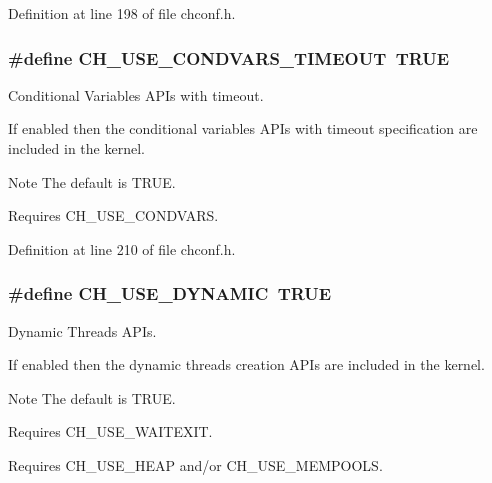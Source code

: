 Definition at line 198 of file chconf.\+h.

\hypertarget{group__config_gaccc2c032c409bced696f75877e270979}{}
\subsubsection[{C\+H\+\_\+\+U\+S\+E\+\_\+\+C\+O\+N\+D\+V\+A\+R\+S\+\_\+\+T\+I\+M\+E\+O\+U\+T}]{\setlength{\rightskip}{0pt plus 5cm}\#define C\+H\+\_\+\+U\+S\+E\+\_\+\+C\+O\+N\+D\+V\+A\+R\+S\+\_\+\+T\+I\+M\+E\+O\+U\+T~T\+R\+U\+E}\label{group__config_gaccc2c032c409bced696f75877e270979}


Conditional Variables A\+P\+Is with timeout. 

If enabled then the conditional variables A\+P\+Is with timeout specification are included in the kernel.

\begin{DoxyNote}{Note}
The default is {\ttfamily T\+R\+U\+E}. 

Requires {\ttfamily C\+H\+\_\+\+U\+S\+E\+\_\+\+C\+O\+N\+D\+V\+A\+R\+S}. 
\end{DoxyNote}


Definition at line 210 of file chconf.\+h.

\hypertarget{group__config_gaae4996e24bbee7d66528671cec8b8749}{}
\subsubsection[{C\+H\+\_\+\+U\+S\+E\+\_\+\+D\+Y\+N\+A\+M\+I\+C}]{\setlength{\rightskip}{0pt plus 5cm}\#define C\+H\+\_\+\+U\+S\+E\+\_\+\+D\+Y\+N\+A\+M\+I\+C~T\+R\+U\+E}\label{group__config_gaae4996e24bbee7d66528671cec8b8749}


Dynamic Threads A\+P\+Is. 

If enabled then the dynamic threads creation A\+P\+Is are included in the kernel.

\begin{DoxyNote}{Note}
The default is {\ttfamily T\+R\+U\+E}. 

Requires {\ttfamily C\+H\+\_\+\+U\+S\+E\+\_\+\+W\+A\+I\+T\+E\+X\+I\+T}. 

Requires {\ttfamily C\+H\+\_\+\+U\+S\+E\+\_\+\+H\+E\+A\+P} and/or {\ttfamily C\+H\+\_\+\+U\+S\+E\+\_\+\+M\+E\+M\+P\+O\+O\+L\+S}. 
\end{DoxyNote}


